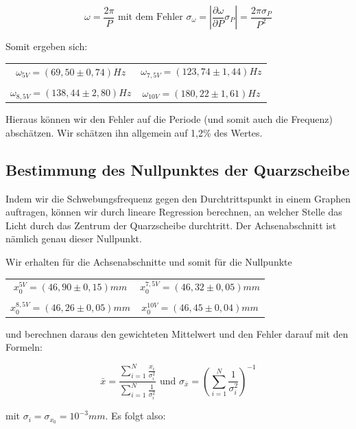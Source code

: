 $$\omega = \frac{2\pi}{P}   \text{ \ \ mit dem Fehler \ \ } 
\sigma_\omega = \left|\frac{\partial \omega}{\partial P}\sigma_P\right| = \frac{2\pi\sigma_P}{P^2}$$

Somit ergeben sich:

\begin{center}
\begin{tabular}[H]{c c}
$\omega_{5V} = (69,50 \pm 0,74) Hz$ & $\omega_{7,5V} = (123,74 \pm 1,44) Hz$\\
 & \\
$\omega_{8,5V} = (138,44 \pm 2,80) Hz$ & $\omega_{10V} = (180,22 \pm 1,61) Hz$
\end{tabular}
\end{center}

Hieraus können wir den Fehler auf die Periode (und somit auch die Frequenz) abschätzen. Wir schätzen ihn allgemein auf 1,2\% des Wertes.

\clearpage

\subsection{Bestimmung des Nullpunktes der Quarzscheibe}

Indem wir die Schwebungsfrequenz gegen den Durchtrittspunkt in einem Graphen auftragen, können wir durch lineare Regression berechnen, an welcher Stelle das Licht durch das Zentrum der Quarzscheibe durchtritt. Der Achsenabschnitt ist nämlich genau dieser Nullpunkt.

Wir erhalten für die Achsenabschnitte und somit für die Nullpunkte 

\begin{center}
\begin{tabular}[H]{c c}
$x_0^{5V} = (46,90 \pm 0,15) mm$ & $x_0^{7,5V} = (46,32 \pm 0,05) mm$\\
 & \\
$x_0^{8,5V} = (46,26 \pm 0,05) mm$ & $x_0^{10V}= (46,45 \pm 0,04) mm$
\end{tabular}
\end{center}


und berechnen daraus den gewichteten Mittelwert und den Fehler darauf mit den Formeln:

$$\bar x = \frac{\sum_{i=1}^{N} \frac{x_i}{\sigma_i^2}}{\sum_{i=1}^{N} \frac{1}{\sigma_i^2}} \text{ \ \ und \ \ } 
\sigma_{\bar x} = \left(\sum_{i=1}^{N} \frac{1}{\sigma_i^2}\right)^{-1} $$

mit $\sigma_i = \sigma_{x_0} = 10^{-3} mm$. Es folgt also: 

